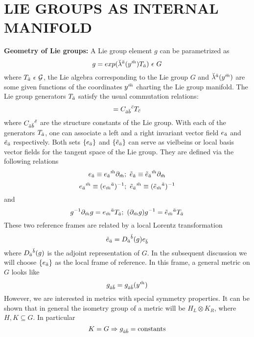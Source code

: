 \documentclass[a4paper,12pt]{article}
\begin{document}
\section{{\bf  LIE GROUPS AS INTERNAL MANIFOLD}}
{\bf Geometry of Lie groups:} A Lie group element $g$ can be parametrized as 
\begin{equation}
g=exp(\breve{\la}^{\as}(y^{\ms})T_{\as})\ \e\ G
\end{equation}
where $T_{\as}\ \e\ \cal{G}$, the Lie algebra corresponding to the Lie group $G$ and $\breve{\lambda}^{\breve{a}}(y^{\breve{m}})$ are some given functions of the coordinates $y^{\breve{m}}$ charting the Lie group manifold. The Lie group generators $T_{\breve{a}}$ satisfy the usual commutation relations:
\begin{equation}
[T_{\as},T_{\bs}]=C_{\as\bs}{}^{\cs}T_{\cs}
\end{equation}
where $C_{\breve{a}\breve{b}}{}^{\breve{c}}$ are the structure constants of the Lie group. With each of the generators $T_{\breve{a}}$, one can associate a left and a right invariant vector field $e_{\breve{a}}$ and $\tilde{e}_{\breve{a}}$ respectively. Both sets $\{e_{\breve{a}}\}$ and $\{\tilde{e}_{\breve{a}}\}$ can serve as vielbeins or local basis vector fields for the tangent space of the Lie group. They are defined via the following relations
\begin{equation}
e_{\as}\equiv e_{\as}{}^{\ms}\p_{\ms};\ \et_{\as}\equiv \et_{\as}{}^{\ms}\p_{\ms}
\end{equation}
\begin{equation}
e_{\as}{}^{\ms}\equiv (e_{\ms}{}^{\as})^{-1};\ \et_{\as}{}^{\ms}\equiv (\et_{\ms}{}^{\as})^{-1}
\end{equation}
and
\begin{equation}
g^{-1}\p_{\ms}g=e_{\ms}{}^{\as}T_{\as} ;\ (\p_{\ms}g)g^{-1}=\et_{\ms}{}^{\as}T_{\as}
\end{equation}
These two reference frames are related by a local Lorentz transformation
\begin{equation}
\tilde{e}_{\breve{a}}=D_{\breve{a}}{}^{\breve{b}}(g)e_{\breve{b}}
\end{equation}
where $D_{\breve{a}}{}^{\breve{b}}(g)$ is the adjoint representation of $G$. In the subsequent discussion we will choose $\{e_{\breve{a}}\}$ as the local frame of reference. In this frame, a general metric on $G$ looks like
$$ g_{\breve{a}\breve{b}}=g_{\breve{a}\breve{b}}(y^{\breve{m}})$$
However, we are interested in metrics with special symmetry properties. It can be shown that in general the isometry group of a metric will be $H_L\otimes K_R$, where $H,K\subseteq G$. In particular \begin{equation}
K=G \Rightarrow g_{\breve{a}\breve{b}}=\mbox{constants}
\end{equation}
\end{document}
